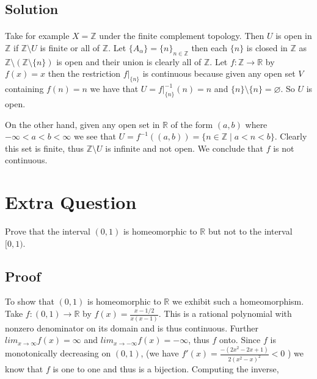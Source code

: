 \documentclass[11pt, oneside]{article}   	%
\newcommand{\R}{\mathbb{R}}
\newcommand{\Z}{\mathbb{Z}}
\newcommand{\bb}[1]{\mathbb{#1}}
\newcommand{\st}{\mid}
\newcommand{\nullset}{\varnothing}
\newcommand{\set}[1]{\{ #1 \}}
\begin{document}
\subsection*{Solution}
\paragraph{}

Take for example $X = \bb{Z}$ under the finite complement topology. Then $U$ is open in $\bb{Z}$ if $\bb{Z} \setminus U$ is finite or all of $\bb{Z}$. Let $\set{A_\alpha} = \set{n}_{n \in \bb{Z}}$ then each $\set{n}$ is closed in $\bb{Z}$ as $\bb{Z} \setminus ( \bb{Z} \setminus \set{n})$ is open and their union is clearly all of $\bb{Z}$. Let $f:\bb{Z} \to \R$ by $f(x) = x$ then the restriction $f \big|_{\set{n}} $ is continuous because given any open set $V$ containing $f(n) = n$ we have that $U = f \big|_{\set{n}}^{-1}(n) = {n}$ and  $\set{n} \setminus \set{n} = \nullset$. So $U$ is open. 

On the other hand, given any open set in $\R$ of the form $(a,b)$ where $-\infty < a< b< \infty$ we see that $U = f^{-1}((a,b)) = \set{n \in \bb{Z} \st a<n<b}$. Clearly this set is finite, thus $\Z \setminus U$ is infinite and not open. We conclude that $f$ is not continuous.









\section*{Extra Question}
Prove that the interval $(0,1)$ is homeomorphic to $\R$ but not to the interval $[0,1)$.

\subsection*{Proof}

To show that $(0,1)$ is homeomorphic to $\R$ we exhibit such a homeomorphism. Take $f:(0,1) \to \R$ by $f(x) = \frac{x-1/2}{x(x-1)}$. This is a rational polynomial with nonzero denominator on its domain and is thus continuous. Further $lim_{x \to \infty} f(x) = \infty$ and $lim_{x \to -\infty} f(x) = -\infty$, thus $f$ onto. Since $f$ is monotonically decreasing on $(0,1)$, (we have $f'(x) = \frac{-(2x^2 - 2x +1)}{2(x^2-x)^2} < 0$ ) we know that $f$ is one to one and thus is a bijection. Computing the inverse, 
\end{document}
